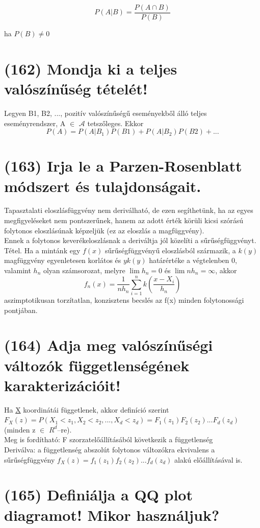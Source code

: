 \documentclass[12p]{article}
\begin{document}
$$P(A|B) = \frac{P(A \cap B)}{P(B)}$$

ha $P(B) \neq 0$

\section{(162) Mondja ki a teljes valószínűség tételét!}

Legyen B1, B2, ..., pozitív valószínűségű eseményekből álló teljes eseményrendszer, A $\in$ $\mathscr{A}$ tetszőleges. Ekkor
$$P(A) = P(A|B_1)P(B1)+P(A|B_2)P(B2)+ ...$$


\section{(163) Irja le a Parzen-Rosenblatt módszert és tulajdonságait.}

Tapasztalati eloszlásfüggvény nem deriválható, de ezen segíthetünk, ha az egyes megfigyeléseket nem pontszerűnek, hanem az adott érték körüli kicsi szórású folytonos eloszlásúnak képzeljük (ez az eloszlás a magfüggvény).\\
Ennek a folytonos keverékeloszlásnak a deriváltja jól közelíti a sűrűségfüggvényt.\\
Tétel. Ha a mintánk egy $f(x)$ sűrűségfüggvényű
eloszlásból származik, a $k(y)$ magfüggvény
egyenletesen korlátos és $yk(y)$ határértéke a
végtelenben 0, valamint $h_n$ olyan számsorozat,
melyre $\lim h_n = 0$ és $\lim nh_n = \infty$, akkor
$$f_n(x) = \frac{1}{nh_n} \sum^{n}_{i=1}k\left(\frac{x-X_i}{h_n}\right)$$ 
aszimptotikusan torzítatlan, konzisztens becslés az f(x) minden folytonossági pontjában.

\section{(164) Adja meg valószínűségi változók függetlenségének karakterizációit!}

Ha \underline{X} koordinátái függetlenek, akkor definíció szerint\\
$F_X(z)=P(X_1<z_1, X_2< z_2,..., X_d<z_d)=F_1(z_1)F_2(z_2)...F_d(z_d)$ (minden z $\in$ $R^d$–re).\\
Meg is fordítható: F szorzatelőállításából következik a függetlenség\\
Deriválva: a függetlenség abszolút folytonos változókra ekvivalens a sűrűségfüggvény 
$f_X(z)=f_1(z_1)f_2(z_2)...f_d(z_d)$ alakú előállításával is.

\section{(165) Definiálja a QQ plot diagramot! Mikor használjuk?}
\end{document}
